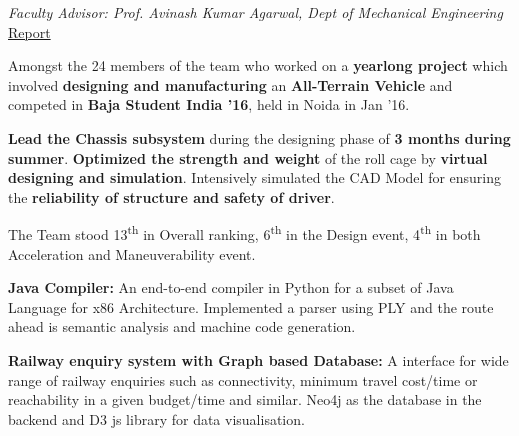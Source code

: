 \documentclass[a4paper]{norm-resume}
\begin{document}
    \vspace{5mm}

    	
    \emph{Faculty Advisor: Prof. Avinash Kumar Agarwal, Dept of Mechanical Engineering} \hfill \small \href{https://tulsyan.github.io/files/projects/B16ChassisDesignReport.pdf}{Report}
    \vspace{3mm}
    \begin{tightitemize}
    \small
    {
    \item Amongst the 24 members of the team who worked on a \textbf{yearlong project} which involved \textbf{designing and manufacturing} an \textbf{All-Terrain Vehicle} and competed in \textbf{Baja Student India ’16}, held in Noida in Jan ’16.
    \item \textbf{Lead the Chassis subsystem} during the designing phase of \textbf{3 months during summer}. \textbf{Optimized the strength and weight} of the roll cage by \textbf{virtual designing and simulation}. Intensively simulated the CAD Model for ensuring the \textbf{reliability of structure and safety of driver}.
    }
    \item The Team stood 13\textsuperscript{th} in Overall ranking, 6\textsuperscript{th} in the Design event, 4\textsuperscript{th} in both Acceleration and Maneuverability event.
    \end{tightitemize}

    \vspace{5mm}


    \vspace{3mm}
    \begin{tightitemize}
    \small
    {
    \item \textbf{Java Compiler:} An end-to-end compiler in Python for a subset of Java Language for x86 Architecture. Implemented a parser using PLY and the route ahead is semantic analysis and machine code generation.
    \item \textbf{Railway enquiry system with Graph based Database:} A interface for wide range of railway enquiries such as connectivity, minimum travel cost/time or reachability in a given budget/time and similar. Neo4j as the database in the backend and D3 js library for data visualisation.
    }
    \end{tightitemize}

    \vspace{5mm}

\end{document}
